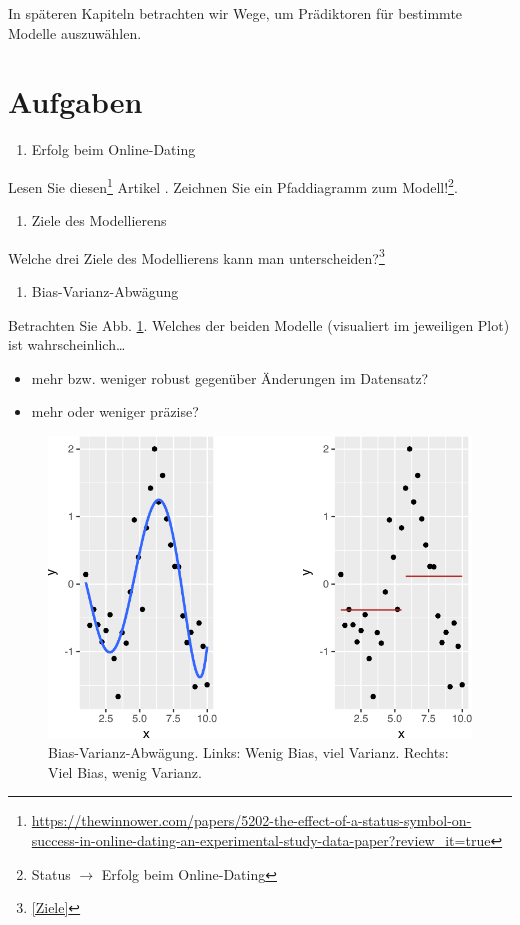 \documentclass[12pt,ngerman,]{book}
\providecommand{\tightlist}{%
  \setlength{\itemsep}{0pt}\setlength{\parskip}{0pt}}
\let\rmarkdownfootnote\footnote%
\def\footnote{\protect\rmarkdownfootnote}
\begin{document}
In späteren Kapiteln betrachten wir Wege, um Prädiktoren für bestimmte
Modelle auszuwählen.

\section{Aufgaben}\label{aufgaben-8}

\begin{enumerate}
\def\labelenumi{\arabic{enumi}.}
\tightlist
\item
  Erfolg beim Online-Dating
\end{enumerate}

Lesen Sie diesen\footnote{\url{https://thewinnower.com/papers/5202-the-effect-of-a-status-symbol-on-success-in-online-dating-an-experimental-study-data-paper?review_it=true}}
Artikel \citep{sauer_wolff}. Zeichnen Sie ein Pfaddiagramm zum
Modell!\footnote{Status \(\rightarrow\) Erfolg beim Online-Dating}.

\begin{enumerate}
\def\labelenumi{\arabic{enumi}.}
\setcounter{enumi}{1}
\tightlist
\item
  Ziele des Modellierens
\end{enumerate}

Welche drei Ziele des Modellierens kann man unterscheiden?\footnote{\ref{Ziele}}

\begin{enumerate}
\def\labelenumi{\arabic{enumi}.}
\setcounter{enumi}{2}
\tightlist
\item
  Bias-Varianz-Abwägung
\end{enumerate}

Betrachten Sie Abb. \ref{fig:plot-bias-variance2}. Welches der beiden
Modelle (visualiert im jeweiligen Plot) ist wahrscheinlich\ldots{}

\begin{itemize}
\tightlist
\item
  mehr bzw. weniger robust gegenüber Änderungen im Datensatz?
\item
  mehr oder weniger präzise?
\end{itemize}

\begin{figure}

{\centering \includegraphics[width=0.7\linewidth]{060_Modellieren_files/figure-latex/plot-bias-variance2-1} 

}

\caption{Bias-Varianz-Abwägung. Links: Wenig Bias, viel Varianz. Rechts: Viel Bias, wenig Varianz.}\label{fig:plot-bias-variance2}
\end{figure}
\end{document}

